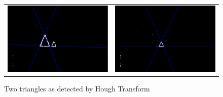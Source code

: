 \documentclass[a4paper, 10pt, notitlepage]{report}
\begin{document}
\begin{figure}[h]
\center
\begin{tabular}{cc}
\includegraphics[scale=0.30]{0002l.png} & 
\includegraphics[scale=0.30]{0002s.png}
\end{tabular}
\label{tab:gt}
\caption{Two triangles as detected by Hough Transform}
\end{figure}
\end{document}
